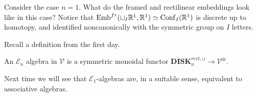 \documentclass{amsart}
\DeclareMathOperator{\Emb}{Emb}
\DeclareMathOperator{\Conf}{Conf}
\begin{document}
\begin{example}
    Consider the case $n=1$. What do the framed and rectilinear embeddings look like in this case?
    Notice that $\Emb^{fr}(\sqcup_I \R^1,\R^1)\simeq \Conf_I(\R^1)$ is discrete up to
    homotopy, and identified noncanonically with the symmetric group on $I$ letters.
\end{example}

Recall a definition from the first day.
\begin{definition}
    An $\mathcal{E}_n$ algebra in $\mathcal{V}$ is a symmetric monoidal functor
    $\mathbf{DISK}_n^{rect,\sqcup} \to \mathcal{V}^\otimes$.
\end{definition}
Next time we will see that $\mathcal{E}_1$-algebras are, in a suitable sense,
equivalent to associative algebras.








\end{document}
